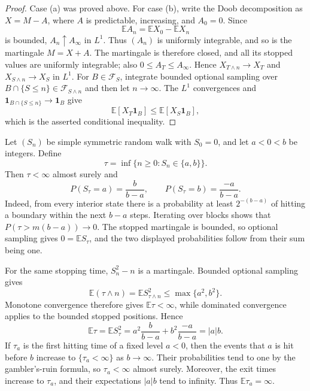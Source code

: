 \begin{proof}
Case (a) was proved above. For case (b), write the Doob decomposition as
$X=M-A$, where $A$ is predictable, increasing, and $A_0=0$. Since
\[
\mathbb EA_n=\mathbb EX_0-\mathbb EX_n
\]
is bounded, $A_n\uparrow A_\infty$ in $L^1$. Thus $(A_n)$ is uniformly
integrable, and so is the martingale $M=X+A$. The martingale is therefore
closed, and all its stopped values are uniformly integrable; also
$0\leq A_T\leq A_\infty$. Hence $X_{T\wedge n}\to X_T$ and
$X_{S\wedge n}\to X_S$ in $L^1$. For $B\in\mathcal F_S$, integrate bounded
optional sampling over
$B\cap\{S\leq n\}\in\mathcal F_{S\wedge n}$ and then let $n\to\infty$.
The $L^1$ convergences and
$\mathbf1_{B\cap\{S\leq n\}}\to\mathbf1_B$ give
\[
\mathbb E[X_T\mathbf1_B]\leq\mathbb E[X_S\mathbf1_B],
\]
which is the asserted conditional inequality.
\end{proof}

\begin{eg}
Let $(S_n)$ be simple symmetric random walk with $S_0=0$, and let
$a<0<b$ be integers. Define
\[
\tau=\inf\{n\geq0:S_n\in\{a,b\}\}.
\]
Then $\tau<\infty$ almost surely and
\[
P(S_\tau=a)=\frac{b}{b-a},
\qquad
P(S_\tau=b)=\frac{-a}{b-a}.
\]
Indeed, from every interior state there is a probability at least
$2^{-(b-a)}$ of hitting a boundary within the next $b-a$ steps. Iterating over
blocks shows that $P(\tau>m(b-a))\to0$. The stopped martingale is bounded, so
optional sampling gives $0=\mathbb ES_\tau$, and the two displayed
probabilities follow from their sum being one.
\end{eg}

\begin{eg}
For the same stopping time,
$S_n^2-n$ is a martingale. Bounded optional sampling gives
\[
\mathbb E(\tau\wedge n)=\mathbb E S_{\tau\wedge n}^2
 \leq\max\{a^2,b^2\}.
\]
Monotone convergence therefore gives $\mathbb E\tau<\infty$, while dominated
convergence applies to the bounded stopped positions. Hence
\[
\mathbb E\tau
 =\mathbb E S_\tau^2
 =a^2\frac{b}{b-a}+b^2\frac{-a}{b-a}
 =|a|b.
\]
If $\tau_a$ is the first hitting time of a fixed level $a<0$, then the events
that $a$ is hit before $b$ increase to $\{\tau_a<\infty\}$ as
$b\to\infty$. Their probabilities tend to one by the gambler's-ruin formula,
so $\tau_a<\infty$ almost surely. Moreover, the exit times increase to
$\tau_a$, and their expectations $|a|b$ tend to infinity. Thus
$\mathbb E\tau_a=\infty$.
\end{eg}

